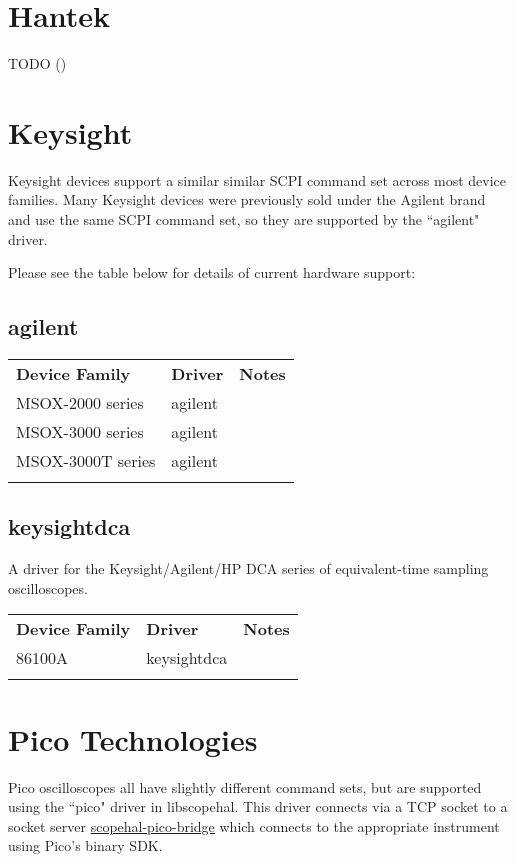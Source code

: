 \section{Hantek}
TODO ()

\section{Keysight}

Keysight devices support a similar similar SCPI command set across most device families. Many Keysight devices were
previously sold under the Agilent brand and use the same SCPI command set, so they are supported by the ``agilent"
driver.

Please see the table below for details of current hardware support:

\subsection{agilent}

\begin{tabularx}{16cm}{llX}
\thickhline
\textbf{Device Family} & \textbf{Driver} & \textbf{Notes} \\
\thickhline
MSOX-2000 series & agilent &  \\
\thinhline
MSOX-3000 series & agilent &  \\
\thinhline
MSOX-3000T series & agilent &  \\
\thickhline
\end{tabularx}

\subsection{keysightdca}

A driver for the Keysight/Agilent/HP DCA series of equivalent-time sampling oscilloscopes.

\begin{tabularx}{16cm}{llX}
\thickhline
\textbf{Device Family} & \textbf{Driver} & \textbf{Notes} \\
\thickhline
86100A & keysightdca &  \\
\thickhline
\end{tabularx}

\section{Pico Technologies}

Pico oscilloscopes all have slightly different command sets, but are supported using the ``pico" driver in libscopehal.
This driver connects via a TCP socket to a socket server
\href{https://github.com/ngscopeclient/scopehal-pico-bridge}{scopehal-pico-bridge} which connects to the appropriate
instrument using Pico's binary SDK.

